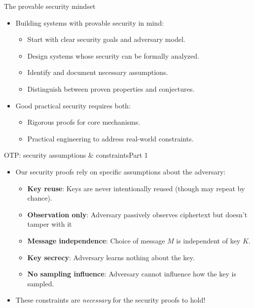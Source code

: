 \documentclass[aspectratio=169, lualatex, handout]{beamer}
\begin{document}
\begin{frame}{The provable security mindset}
	\begin{itemize}[<+->]
		\item Building systems with provable security in mind:
		      \begin{itemize}[<+->]
			      \item Start with clear security goals and adversary model.
			      \item Design systems whose security can be formally analyzed.
			      \item Identify and document necessary assumptions.
			      \item Distinguish between proven properties and conjectures.
		      \end{itemize}
		\item Good practical security requires both:
		      \begin{itemize}[<+->]
			      \item Rigorous proofs for core mechanisms.
			      \item Practical engineering to address real-world constraints.
		      \end{itemize}
	\end{itemize}
\end{frame}

\begin{frame}{OTP: security assumptions \& constraints}{Part 1}
	\begin{itemize}[<+->]
		\item Our security proofs rely on specific assumptions about the adversary:
		      \begin{itemize}[<+->]
			      \item \textbf{Key reuse}: Keys are never intentionally reused (though may repeat by chance).
			      \item \textbf{Observation only}: Adversary passively observes ciphertext but doesn't tamper with it
			      \item \textbf{Message independence}: Choice of message $M$ is independent of key $K$.
			      \item \textbf{Key secrecy}: Adversary learns nothing about the key.
			      \item \textbf{No sampling influence}: Adversary cannot influence how the key is sampled.
		      \end{itemize}
		\item These constraints are \textit{necessary} for the security proofs to hold!
	\end{itemize}
\end{frame}
\end{document}
